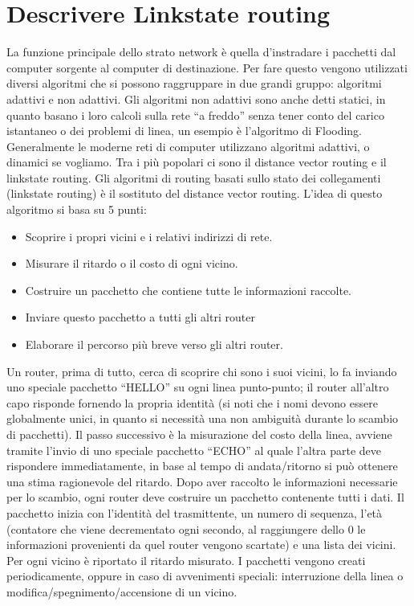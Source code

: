 \section{Descrivere Linkstate routing}

La funzione principale dello strato network è quella d’instradare i pacchetti dal computer sorgente al computer di destinazione. Per fare questo vengono utilizzati diversi algoritmi che si possono raggruppare in due grandi gruppo: algoritmi adattivi e non adattivi. Gli algoritmi non adattivi sono anche detti statici, in quanto basano i loro calcoli sulla rete “a freddo” senza tener conto del carico istantaneo o dei problemi di linea, un esempio è l’algoritmo di Flooding.
Generalmente le moderne reti di computer utilizzano algoritmi adattivi, o dinamici se vogliamo. Tra i più popolari ci sono il distance vector routing e il linkstate routing.
Gli algoritmi di routing basati sullo stato dei collegamenti (linkstate routing) è il sostituto del distance vector routing. L’idea di questo algoritmo si basa su 5 punti:
\begin{itemize}
\item	Scoprire i propri vicini e i relativi indirizzi di rete.
\item	Misurare il ritardo o il costo di ogni vicino.
\item	Costruire un pacchetto che contiene tutte le informazioni raccolte.
\item	Inviare questo pacchetto a tutti gli altri router
\item	Elaborare il percorso più breve verso gli altri router.
\end{itemize}
Un router, prima di tutto, cerca di scoprire chi sono i suoi vicini, lo fa inviando uno speciale pacchetto “HELLO” su ogni linea punto-punto; il router all’altro capo risponde fornendo la propria identità (si noti che i nomi devono essere globalmente unici, in quanto si necessità una non ambiguità durante lo scambio di pacchetti).
Il passo successivo è la misurazione del costo della linea, avviene tramite l’invio di uno speciale pacchetto “ECHO” al quale l’altra parte deve rispondere immediatamente, in base al tempo di andata/ritorno si può ottenere una stima ragionevole del ritardo.
Dopo aver raccolto le informazioni necessarie per lo scambio, ogni router deve costruire un pacchetto contenente tutti i dati. Il pacchetto inizia con l’identità del trasmittente, un numero di sequenza, l’età (contatore che viene decrementato ogni secondo, al raggiungere dello 0 le informazioni provenienti da quel router vengono scartate) e una lista dei vicini. Per ogni vicino è riportato il ritardo misurato. I pacchetti vengono creati periodicamente, oppure in caso di avvenimenti speciali: interruzione della linea o modifica/spegnimento/accensione di un vicino.
